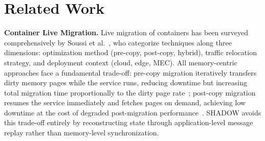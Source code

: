 \documentclass[conference]{IEEEtran}
\begin{document}
\section{Related Work}
\label{sec:related}

\textbf{Container Live Migration.}
Live migration of containers has been surveyed comprehensively by Soussi
et al.~\cite{soussi2024survey}, who categorize techniques along three
dimensions: optimization method (pre-copy, post-copy, hybrid), traffic
relocation strategy, and deployment context (cloud, edge, MEC). All
memory-centric approaches face a fundamental trade-off: pre-copy migration
iteratively transfers dirty memory pages while the service runs, reducing
downtime but increasing total migration time proportionally to the dirty page
rate~\cite{lu2023mbdpc}; post-copy migration resumes the service immediately
and fetches pages on demand, achieving low downtime at the cost of degraded
post-migration performance~\cite{tazzioli2023postcopy}. SHADOW avoids this
trade-off entirely by reconstructing state through application-level message
replay rather than memory-level synchronization.
\end{document}
